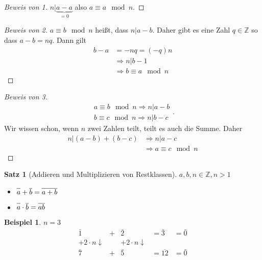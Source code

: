 \documentclass{article}
\theoremstyle{definition}
\newtheorem*{bei*}{Beispiel}
\theoremstyle{plain}
\newtheorem{sa}[definition]{Satz}
\begin{document}
\begin{proof}[Beweis von 1]
	$ n | \underbrace{a-a}_{=0} $ also $ a \equiv a \mod n $. 
\end{proof}
\begin{proof}[Beweis von 2] 
	$ a \equiv b \mod n $ hei\ss t, dass $ n | a-b $. Daher gibt es eine Zahl $ q \in \mathbb{Z} $ so dass $ a - b = nq $. Dann gilt
	\begin{align*}
		b - a & = -nq = (-q)n \\
		& \Rightarrow n | b-1 \\
		& \Rightarrow \boxed{b \equiv a \mod n}
	\end{align*}
\end{proof}
\begin{proof}[Beweis von 3]
	\[ 
	\begin{array}{ll}
		a \equiv b \mod n \Rightarrow n | a-b \\
		b \equiv c \mod n \Rightarrow n | b-c
	\end{array}.
	 \]
	 Wir wissen schon, wenn $ n $ zwei Zahlen teilt, teilt es auch die Summe. Daher
	 \begin{align*}
	 	n | (a-b) + (b-c) & \Rightarrow n | a-c \\
	 	& \Rightarrow a \equiv c \mod n
	 \end{align*}
\end{proof}
\begin{sa}[Addieren und Multiplizieren von Restklassen]
	$ a,b,n \in \mathbb{Z}, n>1 $
	\begin{itemize}
		\item $ \overline{\vphantom{b}a} + \overline{b} = \overline{a+b} $
		\item $ \overline{\vphantom{b}a} \cdot \overline{b} = \overline{ab} $
	\end{itemize}
\end{sa}
\begin{bei*}
	$ n=3 $
	\[ 
	\begin{array}{rlrll}
		\bar{1} & + & \bar{2} & = \bar{3} & = \bar{0} \\
		+ 2 \cdot n\downarrow & & + 2 \cdot n \downarrow & & \\
		\bar{7} & + & \bar{5} & = \overline{12} & = \bar{0} 
	\end{array}
	 \]
\end{bei*}
\end{document}
